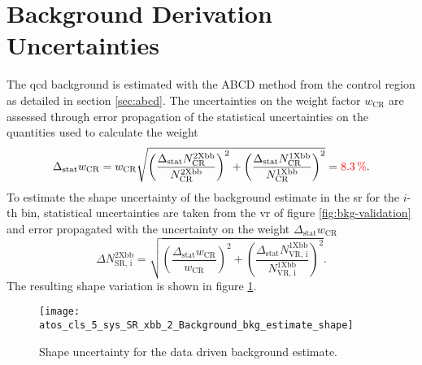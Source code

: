 \section{Background Derivation Uncertainties}
The \ac{qcd} background is estimated with the ABCD method from the control region as detailed in section \ref{sec:abcd}. The uncertainties on the weight factor $w_\text{CR}$ are assessed through error propagation of the statistical uncertainties on the quantities used to calculate the weight
\begin{equation}
    \Delta_\text{stat} w_\text{CR} = w_\text{CR} \sqrt{
        \left(\frac{\Delta_\text{stat} N_\text{CR}^\text{2Xbb}}{N_\text{CR}^\text{2Xbb}}\right)^2
        +
        \left(\frac{\Delta_\text{stat} N_\text{CR}^\text{1Xbb}}{N_\text{CR}^\text{1Xbb}}\right)^2
    }
    = \textcolor{red}{\qty[]{8.3}{\percent}}.
\end{equation}
To estimate the shape uncertainty of the background estimate in the \ac{sr} for the $i$-th bin, statistical uncertainties are taken from the \ac{vr} of figure \ref{fig:bkg-validation} and error propagated with the uncertainty on the weight $\Delta_\text{stat} w_\text{CR}$
\begin{equation}
    \Delta N_\text{SR, i}^\text{2Xbb}
    =
    \sqrt{
        \left(\frac{\Delta_\text{stat} w_\text{CR}}{w_\text{CR}}\right)^2
        +
        \left(\frac{\Delta_\text{stat} N_\text{VR, i}^\text{1Xbb}}{N_\text{VR, i}^\text{1Xbb}}\right)^2
    }.
\end{equation}
The resulting shape variation is shown in figure \ref{fig:bkg-estimate-shape}.
\begin{figure}
    \centering
    \texttt{[image: atos\_cls\_5\_sys\_SR\_xbb\_2\_Background\_bkg\_estimate\_shape]}
    \caption[]{Shape uncertainty for the data driven background estimate. }
    \label{fig:bkg-estimate-shape}
\end{figure}

